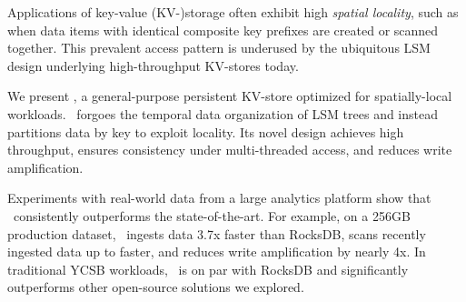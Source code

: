 Applications of key-value (KV-)storage often exhibit high \emph{spatial locality}, such as  
when data items with identical composite key prefixes are created or scanned together.  
This prevalent access pattern is underused by the ubiquitous LSM  design underlying 
high-throughput KV-stores today.

We present \sys, a general-purpose persistent KV-store optimized for spatially-local %
workloads. 
\sys\ forgoes the temporal data organization of LSM trees and instead partitions data by key to exploit locality. 
Its novel design achieves high throughput, 
ensures consistency under multi-threaded access,   
and reduces write amplification. 

Experiments with real-world data from a large analytics platform show that \sys\  
consistently outperforms the state-of-the-art. For example, on a 256GB production dataset, 
\sys\ ingests data 3.7x faster than RocksDB,  scans recently ingested data up to  faster, 
and reduces write amplification by nearly 4x. 
In traditional YCSB workloads, %
\sys\ is on par with RocksDB and significantly outperforms other open-source solutions we explored.
